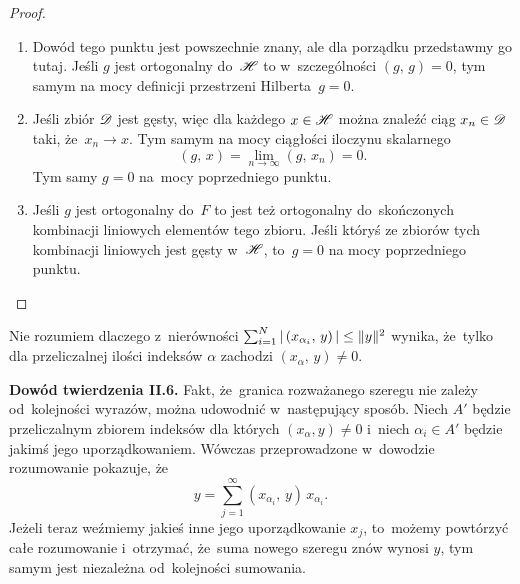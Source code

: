 \documentclass[a4paper,11pt]{article}
\begin{document}
\begin{proof}

  \begin{enumerate}
  \item Dowód tego punktu jest powszechnie znany, ale dla porządku
    przedstawmy go tutaj. Jeśli $g$ jest ortogonalny do~$\mathcal{H}$ to
    w~szczególności $( g, \, g ) = 0$, tym samym na mocy definicji
    przestrzeni Hilberta~$g = 0$.

  \item Jeśli zbiór $\mathcal{D}$ jest gęsty, więc dla każdego $x \in \mathcal{H}$
    można znaleźć ciąg $x_{ n } \in \mathcal{D}$ taki, że~$x_{ n } \to x$. Tym
    samym na mocy ciągłości iloczynu skalarnego
    \begin{equation}
      \label{eq:RS-Vol-I-s01-18}
      ( g, \, x ) = \lim_{ n \to \infty } ( g, \, x_{ n } ) = 0.
    \end{equation}
    Tym samy $g = 0$ na~mocy poprzedniego punktu.

  \item Jeśli $g$ jest ortogonalny do~$F$ to jest też ortogonalny
    do~skończonych kombinacji liniowych elementów tego zbioru. Jeśli
    któryś ze zbiorów tych kombinacji liniowych jest gęsty w~$\mathcal{H}$,
    to~$g = 0$ na mocy poprzedniego punktu.

  \end{enumerate}

\end{proof}

\vspace{\spaceFour}



\start {} Nie rozumiem dlaczego z~nierówności
$\sum_{ i = 1 }^{ N } |\, {  ( x_{ \alpha_{ i } }, \,  y )  } \,| \leq \lVert{ 
  y  }\rVert^{ 2 }$ wynika, że~tylko dla przeliczalnej ilości indeksów $\alpha$
zachodzi $( x_{ \alpha }, \, y ) \neq 0$. \Dok

\vspace{\spaceFour}



\start {} \textbf{Dowód twierdzenia II.6.} Fakt, że~granica
rozważanego szeregu nie zależy od~kolejności wyrazów, można udowodnić
w~następujący sposób. Niech $A'$ będzie przeliczalnym zbiorem indeksów
dla których $( x_{ \alpha }, y ) \neq 0$ i~niech $\alpha_{ i } \in A'$
będzie jakimś jego uporządkowaniem. Wówczas przeprowadzone w~dowodzie
rozumowanie pokazuje, że
\begin{equation}
  \label{eq:RS-Vol-I-s01-18}
  y = \sum_{ j = 1 }^{ \infty } ( x_{ \alpha_{ i } }, \, y ) \, x_{ \alpha_{ i } }.
\end{equation}
Jeżeli teraz weźmiemy jakieś inne jego uporządkowanie $x_{ j }$,
to~możemy powtórzyć całe rozumowanie i~otrzymać, że~suma nowego
szeregu znów wynosi $y$, tym samym jest niezależna od~kolejności
sumowania.
\end{document}
